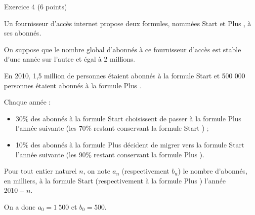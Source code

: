 
%
\begin{h2}Exercice 4 (6 points)\end{h2}
\par
Un fournisseur d'accès internet propose deux formules, nommées \og Start \fg{} et \og Plus \fg{}, à ses abonnés.
\par
On suppose que le nombre global d'abonnés à ce fournisseur d'accès est stable d'une année sur l'autre et égal à 2 millions.
\par
En 2010, 1,5 million de personnes étaient abonnés à la formule \og Start \fg{} et 500 000 personnes étaient abonnés à la formule \og Plus \fg{}.
\par
Chaque année :
\par
\begin{itemize}
     \item 30\% des abonnés à la formule \og Start \fg{} choisissent de passer à la formule \og Plus  \fg{} l'année suivante (les 70\% restant conservant la formule \og Start \fg{}) ;
     \item 10\% des abonnés à la formule \og Plus \fg{} décident de migrer vers la formule \og Start  \fg{} l'année suivante (les 90\% restant conservant la formule \og Plus \fg{}).
\end{itemize}
\par
Pour tout entier naturel $n$, on note $a_n$ (respectivement $b_n$) le nombre d'abonnés, en milliers, à la formule \og Start \fg{} (respectivement à la formule \og Plus \fg{} ) l'année $2010+n$.
\par
On a donc ${a_0=1~500}$ et ${b_0=500}$.
\par
